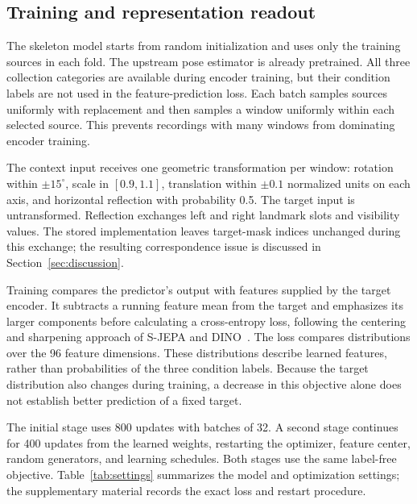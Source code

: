 \documentclass[10pt,twocolumn,letterpaper]{article}
\begin{document}
\subsection{Training and representation readout}
The skeleton model starts from random initialization and uses only the training sources in each fold. The upstream pose estimator is already pretrained. All three collection categories are available during encoder training, but their condition labels are not used in the feature-prediction loss. Each batch samples sources uniformly with replacement and then samples a window uniformly within each selected source. This prevents recordings with many windows from dominating encoder training.

The context input receives one geometric transformation per window: rotation within $\pm15^\circ$, scale in $[0.9,1.1]$, translation within $\pm0.1$ normalized units on each axis, and horizontal reflection with probability 0.5. The target input is untransformed. Reflection exchanges left and right landmark slots and visibility values. The stored implementation leaves target-mask indices unchanged during this exchange; the resulting correspondence issue is discussed in Section~\ref{sec:discussion}.

Training compares the predictor's output with features supplied by the target encoder. It subtracts a running feature mean from the target and emphasizes its larger components before calculating a cross-entropy loss, following the centering and sharpening approach of S-JEPA and DINO~\cite{sjepa,dino}. The loss compares distributions over the 96 feature dimensions. These distributions describe learned features, rather than probabilities of the three condition labels. Because the target distribution also changes during training, a decrease in this objective alone does not establish better prediction of a fixed target.

The initial stage uses 800 updates with batches of 32. A second stage continues for 400 updates from the learned weights, restarting the optimizer, feature center, random generators, and learning schedules. Both stages use the same label-free objective. Table~\ref{tab:settings} summarizes the model and optimization settings; the supplementary material records the exact loss and restart procedure.
\end{document}
